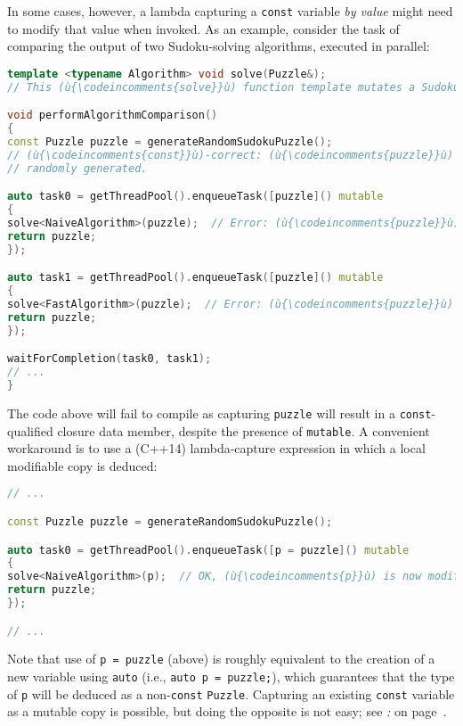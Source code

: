 \noindent In some cases, however, a lambda capturing a \texttt{const} variable
\emph{by value} might need to modify that value when invoked. As an
example, consider the task of comparing the output of two Sudoku-solving
algorithms, executed in parallel:

\begin{lstlisting}[language=C++]
template <typename Algorithm> void solve(Puzzle&);
// This (ù{\codeincomments{solve}}ù) function template mutates a Sudoku grid in place to solution.

void performAlgorithmComparison()
{
const Puzzle puzzle = generateRandomSudokuPuzzle();
// (ù{\codeincomments{const}}ù)-correct: (ù{\codeincomments{puzzle}}ù) is not going to be mutated after being
// randomly generated.

auto task0 = getThreadPool().enqueueTask([puzzle]() mutable
{
solve<NaiveAlgorithm>(puzzle);  // Error: (ù{\codeincomments{puzzle}}ù) is (ù{\codeincomments{const}}ù)-qualified.
return puzzle;
});

auto task1 = getThreadPool().enqueueTask([puzzle]() mutable
{
solve<FastAlgorithm>(puzzle);  // Error: (ù{\codeincomments{puzzle}}ù) is (ù{\codeincomments{const}}ù)-qualified.
return puzzle;
});

waitForCompletion(task0, task1);
// ...
}
\end{lstlisting}

\noindent The code above will fail to compile as capturing \texttt{puzzle} will
result in a \texttt{const}-qualified closure data member, despite the
presence of \texttt{mutable}. A convenient workaround is to use a
(C++14) lambda-capture expression in which a local modifiable copy is deduced:

\begin{lstlisting}[language=C++]
// ...

const Puzzle puzzle = generateRandomSudokuPuzzle();

auto task0 = getThreadPool().enqueueTask([p = puzzle]() mutable
{
solve<NaiveAlgorithm>(p);  // OK, (ù{\codeincomments{p}}ù) is now modifiable.
return puzzle;
});

// ...
\end{lstlisting}

\noindent Note that use of \texttt{p}~\texttt{=}~\texttt{puzzle} (above) is
roughly equivalent to the creation of a new variable using
\texttt{auto} (i.e.,
\texttt{auto}~\texttt{p}~\texttt{=}~\texttt{puzzle;}), which guarantees
that the type of \texttt{p} will be deduced as a non-\texttt{const}
\texttt{Puzzle}. Capturing an existing \texttt{const} variable as a mutable copy is
possible, but doing the opposite is not easy; see
\textit{: } on page~\pageref{there’s-no-easy-way-to-synthesize-a-const-data-member}.

